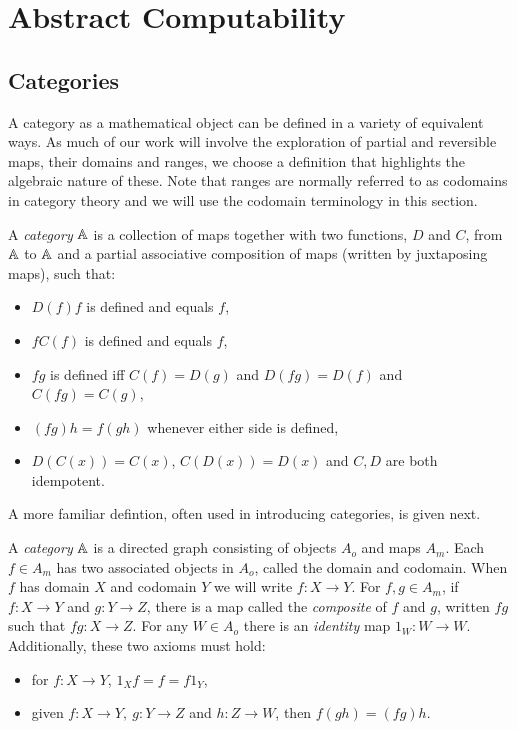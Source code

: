 
\chapter{Abstract Computability}\label{chap:abstract_computability}
\section{Categories} %
\label{sec:categories}

A category as a mathematical object can be defined in a variety of equivalent ways. As much of our
work will involve the exploration of partial and reversible maps, their domains and ranges, we
choose a definition that highlights the algebraic nature of these. Note that ranges are normally
referred to as codomains in category theory and we will use the codomain terminology in this
section.

\begin{definition}\label{def:category}
  A \emph{category} $\mathbb{A}$ is a collection of maps together with two functions, $D$ and $C$, from
  $\mathbb{A}$ to $\mathbb{A}$ and a partial associative composition of maps (written by juxtaposing maps), such
  that:
  \begin{itemize}
    \item[\catone] $D(f) f$ is defined and equals $f$,
    \item[\cattwo] $f C(f)$ is defined and equals $f$,
    \item[\catthree] $f g$ is defined iff $C(f) = D(g)$ and $D(f g) = D(f)$ and $C(f g) = C(g)$,
    \item[\catfour] $(f g) h = f (g h)$ whenever either side is defined,
    \item[\catfive] $D(C(x)) = C(x)$, $C(D(x)) = D(x)$ and $C,D$ are both idempotent.
  \end{itemize}
\end{definition}

A more familiar defintion, often used in introducing categories, is given next.

\begin{definition}\label{def:category_alt}
  A \emph{category} $\mathbb{A}$ is a directed graph consisting of objects $A_o$ and maps $A_m$. Each $f\in
  A_m$ has two associated objects in $A_o$, called the domain and codomain. When $f$ has domain $X$
  and codomain $Y$ we will write $f:X \to Y$. For $f, g \in A_m$, if $f:X\to Y$ and $g:Y \to Z$,
  there is a map called the \emph{composite} of $f$ and $g$, written $fg$ such that $fg:X \to Z$.
  For any $W \in A_o$ there is an \emph{identity} map $1_W:W \to W$. Additionally, these two axioms
  must hold:
  \begin{itemize}
    \item[\axiom{C'}{1}] for $f:X \to Y$, $1_X f = f = f 1_Y$,
    \item[\axiom{C'}{2}] given $f:X \to Y,\ g:Y \to Z$ and $h: Z\to W$, then $f (g h) = (f g) h$.
  \end{itemize}

\end{definition}

